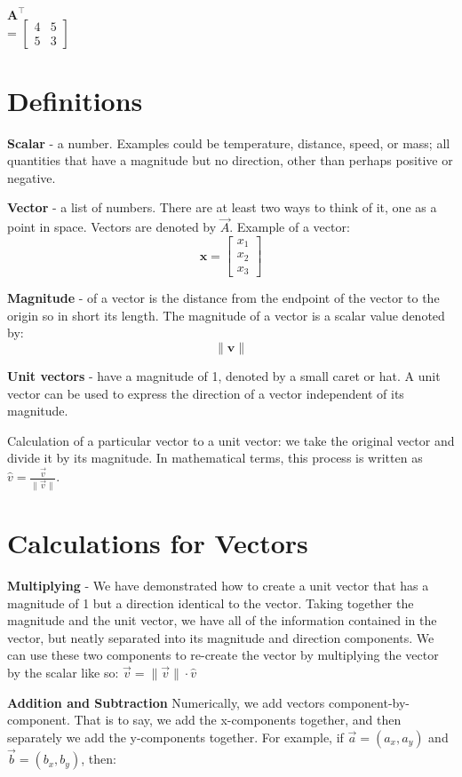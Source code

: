 \documentclass{article}
\begin{document}
$\mathbf{A}^\intercal$\\= $\begin{bmatrix}
  4 & 5 \\
  5 & 3
\end{bmatrix}$
\section{Definitions}
\textbf{Scalar} - a number. Examples could be temperature, distance, speed, or mass; all quantities that have a magnitude but no direction, other than perhaps positive or negative.

\textbf{Vector} - a list of numbers. There are at least two ways to think of it, one as a point in space. Vectors are denoted by $\vec{A}$.
Example of a vector:
\begin{equation}
  \mathbf{x}= \begin{bmatrix} x_{1} \\ x_{2} \\ x_{3} \end{bmatrix}
  \label{vectorLatex}
\end{equation}

\textbf{Magnitude} - of a vector is the distance from the endpoint of the vector to the origin so in short its length. The magnitude of a vector is a scalar value denoted by:
\[
  \| \mathbf{v} \|
\]

\textbf{Unit vectors} - have a magnitude of 1, denoted by a small caret or hat. A unit vector can be used to express the direction of a vector independent of its magnitude.

Calculation of a particular vector to a unit vector: we take the original vector and divide it by its magnitude. In mathematical terms, this process is written as $\hat{v} = \frac{\vec{v}}{\|\vec{v}\|}$.

\section{Calculations for Vectors}
\textbf{Multiplying} - We have demonstrated how to create a unit vector that has a magnitude of 1 but a direction identical to the vector. Taking together the magnitude and the unit vector, we have all of the information contained in the vector, but neatly separated into its magnitude and direction components. We can use these two components to re-create the vector by multiplying the vector by the scalar like so: $\vec{v} = \|\vec{v}\| \cdot \hat{v}$

\textbf{Addition and Subtraction} 
Numerically, we add vectors component-by-component. That is to say, we add the x-components together, and then separately we add the y-components together. For example, if $\vec{a} = (a_x, a_y)$ and $\vec{b} = (b_x, b_y)$, then:
\end{document}
